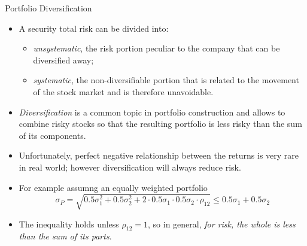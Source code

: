 \documentclass{beamer}
\begin{document}
\begin{frame}{Portfolio Diversification}
  \begin{itemize}
  \item A security total risk can be divided into:
    \begin{itemize}
      \item \emph{unsystematic}, the risk portion peculiar to the company that can be diversified away;
      \item \emph{systematic}, the non-diversifiable portion that is related to the movement of the stock market and is therefore unavoidable.
    \end{itemize}
  \item \emph{Diversification} is a common topic in portfolio construction and allows to combine risky stocks so that the resulting portfolio is less risky than the sum of its components. 
  \item Unfortunately, perfect negative relationship between the returns is very rare in real world; however diversification will always reduce risk.
  \item For example assumng an equally weighted portfolio
    \begin{equation*}
      \sigma_P = \sqrt{0.5\sigma_1^2 + 0.5\sigma_2^2 + 2 \cdot 0.5\sigma_1 \cdot 0.5\sigma_2\cdot\rho_{12}} \le  0.5\sigma_1 + 0.5\sigma_2
    \end{equation*}
  \item The inequality holds unless $\rho_{12} = 1$, so in general, \emph{for risk, the whole is less than the sum of its parts}.
    \end{itemize}
\end{frame}
\end{document}
